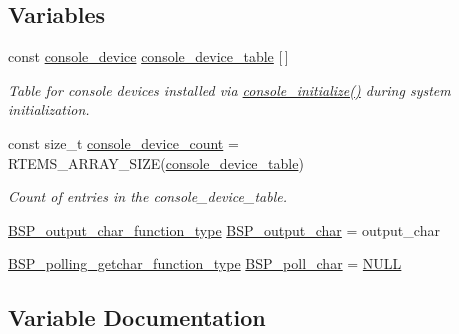 \subsection*{Variables}
\begin{DoxyCompactItemize}
\item 
const \mbox{\hyperlink{structconsole__device}{console\+\_\+device}} \mbox{\hyperlink{group__ConsoleTermios_ga7f058e756eb724397922b823131fba5c}{console\+\_\+device\+\_\+table}} \mbox{[}$\,$\mbox{]}
\begin{DoxyCompactList}\small\item\em Table for console devices installed via \mbox{\hyperlink{arm_2raspberrypi_2console_2console-config_8c_a4bdc321ef3ab62a261d77b5dbe075566}{console\+\_\+initialize()}} during system initialization. \end{DoxyCompactList}\item 
const size\+\_\+t \mbox{\hyperlink{group__ConsoleTermios_gabca2c9c9873b0482f9fd306e6bade017}{console\+\_\+device\+\_\+count}} = R\+T\+E\+M\+S\+\_\+\+A\+R\+R\+A\+Y\+\_\+\+S\+I\+ZE(\mbox{\hyperlink{group__ConsoleTermios_ga7f058e756eb724397922b823131fba5c}{console\+\_\+device\+\_\+table}})
\begin{DoxyCompactList}\small\item\em Count of entries in the console\+\_\+device\+\_\+table. \end{DoxyCompactList}\item 
\mbox{\hyperlink{bspIo_8h_a0b0dff1c3d35110ae303b4098c60dc14}{B\+S\+P\+\_\+output\+\_\+char\+\_\+function\+\_\+type}} \mbox{\hyperlink{arm_2altera-cyclone-v_2console_2console-config_8c_a5fb8c9c4f076f0340b4a17ed432ced5c}{B\+S\+P\+\_\+output\+\_\+char}} = output\+\_\+char
\item 
\mbox{\hyperlink{bspIo_8h_a132b9ceff428a634ece5dfaac7ef1006}{B\+S\+P\+\_\+polling\+\_\+getchar\+\_\+function\+\_\+type}} \mbox{\hyperlink{arm_2altera-cyclone-v_2console_2console-config_8c_ae5846eecdfa8f2813504371bf01c29b0}{B\+S\+P\+\_\+poll\+\_\+char}} = \mbox{\hyperlink{bestcomm__api_8h_a872bb74de61c3689ccd5b41873fce42c}{N\+U\+LL}}
\end{DoxyCompactItemize}


\subsection{Variable Documentation}
\mbox{\label{arm_2altera-cyclone-v_2console_2console-config_8c_a5fb8c9c4f076f0340b4a17ed432ced5c}} 
